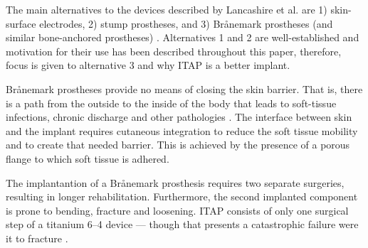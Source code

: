 The main alternatives to the devices described by Lancashire et al. are 1) skin-surface electrodes, 2) stump prostheses, and 3) Brånemark prostheses (and similar bone-anchored prostheses) \cite{LiYan2021Tbap}.
Alternatives 1 and 2 are well-established and motivation for their use has been described throughout this paper, therefore, focus is given to alternative 3 and why ITAP is a better implant.

Brånemark prostheses provide no means of closing the skin barrier. That is, there is a path from the outside to the inside of the body that leads to soft-tissue infections, chronic discharge and other pathologies \cite{kang_osseocutaneous_2010}.
The interface between skin and the implant requires cutaneous integration to reduce the soft tissue mobility and to create that needed barrier.
This is achieved by the presence of a porous flange to which soft tissue is adhered.

The implantantion of a Brånemark prosthesis requires two separate surgeries, resulting in longer rehabilitation. Furthermore, the second implanted component is prone to bending, fracture and loosening.
ITAP consists of only one surgical step of a titanium 6--4 device --- though that presents a catastrophic failure were it to fracture \cite{kang_osseocutaneous_2010}. 